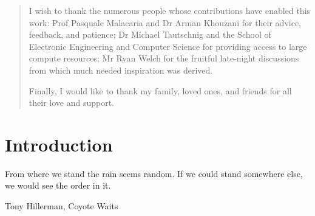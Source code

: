 \documentclass[12pt, titlepage]{report}
\theoremstyle{definition}
\begin{document}
\tableofcontents
\clearpage


\listoffigures

\listoftables
\clearpage



\renewcommand{\abstractname}{Acknowledgements}
\begin{abstract}
I wish to thank the numerous people whose contributions have enabled this work: Prof Pasquale Malacaria and Dr Arman Khouzani for their advice, feedback, and patience; Dr Michael Tautschnig and the School of Electronic Engineering and Computer Science for providing access to large compute resources; Mr Ryan Welch for the fruitful late-night discussions from which much needed inspiration was derived.

Finally, I would like to thank my family, loved ones, and friends for all their love and support.
\end{abstract}



\chapter{Introduction}
\epigraph{From where we stand the rain seems random. If we could stand somewhere else, we would see the order in it.}{Tony Hillerman, Coyote Waits}
\end{document}

